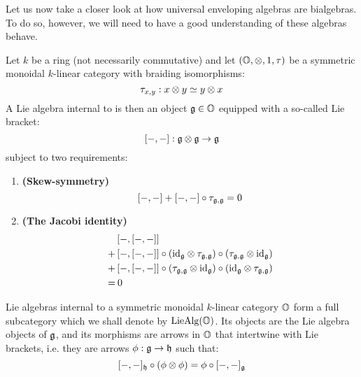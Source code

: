                     Let us now take a closer look at how universal enveloping algebras are bialgebras. To do so, however, we will need to have a good understanding of these algebras behave. 
                    \begin{definition} \label{def: lie_algebras}
                        Let $k$ be a ring (not necessarily commutative) and let $(\O, \tensor, 1, \tau)$ be a symmetric monoidal $k$-linear category with braiding isomorphisms:
                            $$\tau_{x, y}: x \tensor y \cong y \tensor x$$
                        A Lie algebra internal to is then an object $\mathfrak{g} \in \mathbb{O}$ equipped with a so-called Lie bracket:
                            $$[-,-]: \g \tensor \g \to \g$$
                        subject to two requirements:
                            \begin{enumerate}
                                \item \textbf{(Skew-symmetry)}
                                    $$[-,-] + [-,-] \circ \tau_{\mathfrak{g}, \mathfrak{g}} = 0$$
                                \item \textbf{(The Jacobi identity)}
                                    $$
                                        \begin{aligned}
                                            & \left[-, [-,-]\right]
                                            \\
                                            + & \left[-, [-,-]\right] \circ \left(\id_{\g} \tensor \tau_{\g, \g}\right) \circ \left(\tau_{\g, \g} \tensor \id_{\g}\right)
                                            \\
                                            + & \left[-, [-,-]\right] \circ \left(\tau_{\g, \g} \tensor \id_{\g}\right) \circ \left(\id_{\g} \tensor \tau_{\g, \g}\right)
                                            \\
                                            = & \: 0
                                        \end{aligned}
                                    $$
                            \end{enumerate}
                        Lie algebras internal to a symmetric monoidal $k$-linear category $\mathbb{O}$ form a full subcategory which we shall denote by $\mathrm{Lie}\mathrm{Alg}(\mathbb{O})$. Its objects are the Lie algebra objects of $\mathfrak{g}$, and its morphisms are arrows in $\mathbb{O}$ that intertwine with Lie brackets, i.e. they are arrows $\phi: \mathfrak{g} \to \mathfrak{h}$ such that:
                            $$[-,-]_{\h} \circ (\phi \tensor \phi) = \phi \circ [-,-]_{\g}$$

\end{definition}
